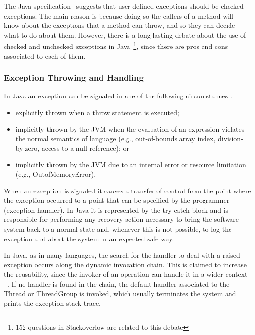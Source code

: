 \documentclass[conference]{IEEEtran}
\begin{document}
The Java specification~\cite{gosling2000java} suggests that user-defined
exceptions should be checked exceptions. The main reason is because doing so the
callers of a method will know about the exceptions that a method can throw, and
so they can decide what to do about them. However, there is a long-lasting
debate about the use of checked and unchecked exceptions in
Java~\cite{javatut,stackoverlow,debate}\footnote{152 questions in Stackoverlow
are related to this debate}, since there are pros and cons associated to each of
them.

\subsubsection{Exception Throwing and Handling}

In Java an exception can be signaled in one of the following
circumstances~\cite{gosling2000java}:

\begin{itemize} \item  explicitly thrown when a throw statement is executed;
  \item  implicitly thrown by the JVM when the evaluation of an expression
    violates the normal semantics of language (e.g., out-of-bounds array index,
    division-by-zero, access to a null reference); or \item implicitly thrown by
    the JVM due to an internal error or resource limitation (e.g.,
    OutofMemoryError).  \end{itemize}
When an exception is signaled it causes a transfer of control from the point
where the exception occurred to a point that can be specified by the programmer
(exception handler). In Java it is represented by the try-catch block and is
responsible for performing any recovery action necessary to bring the software
system back to a normal state and, whenever this is not possible, to log the
exception and abort the system in an expected safe way.

In Java, as in many languages, the search for the handler to deal with a raised
exception occurs along the dynamic invocation chain. This is claimed to increase
the reusability, since the invoker of an operation can handle it in a wider
context ~\cite{goodenough1975exception}. If no handler is found in the chain,
the default handler associated to the Thread or ThreadGroup is invoked, which
usually terminates the system and prints the exception stack trace.
\end{document}
